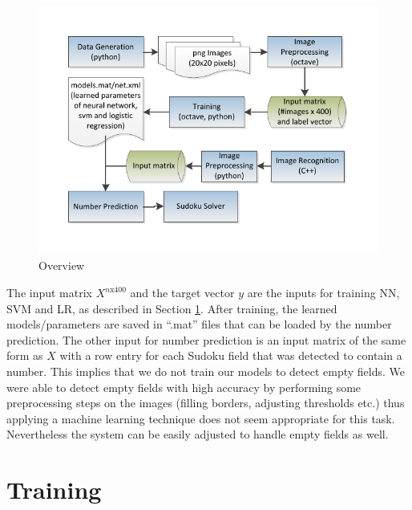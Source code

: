 \documentclass{article}
\begin{document}
\begin{figure}[ht]
	\centerline{\includegraphics[width=\columnwidth, trim=25 30 25 30]{../overview}}
	\caption{Overview}
	\label{fig:overview}
\end{figure}
The input matrix $X^{n\text{x}400}$ and the target vector $y$ are the inputs for training NN, SVM and LR, as described in Section \ref{training}. After training, the learned models/parameters are saved in ``.mat'' files that can be loaded by the number prediction. The other input for number prediction is an input matrix of the same form as $X$ with a row entry for each Sudoku field that was detected to contain a number. This implies that we do not train our models to detect empty fields. We were able to detect empty fields with high accuracy by performing some preprocessing steps on the images (filling borders, adjusting thresholds etc.) thus applying a machine learning technique does not seem appropriate for this task. Nevertheless the system can be easily adjusted to handle empty fields as well.

\section{Training}
\label{training}
\end{document}

